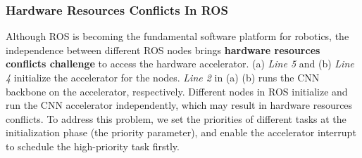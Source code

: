  


\subsubsection{Hardware Resources Conflicts In ROS} Although ROS is becoming the fundamental software platform for robotics, the independence between different ROS nodes brings \textbf{hardware resources conflicts challenge} to access the hardware accelerator. 
(a) \textit{Line 5} and (b) \textit{Line 4} initialize the accelerator for the nodes. \textit{Line 2} in (a) (b) runs the CNN backbone on the accelerator, respectively. Different nodes in ROS initialize and run the CNN accelerator independently, which may result in hardware resources conflicts. To address this problem, we set the priorities of different tasks at the initialization phase (the priority parameter), and enable the accelerator interrupt to schedule the high-priority task firstly.




